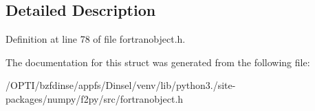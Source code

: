 \subsection{Detailed Description}


Definition at line 78 of file fortranobject.\+h.



The documentation for this struct was generated from the following file\+:\begin{DoxyCompactItemize}
\item 
/\+O\+P\+T\+I/bzfdinse/appfs/\+Dinsel/venv/lib/python3./site-\/packages/numpy/f2py/src/fortranobject.\+h\end{DoxyCompactItemize}
